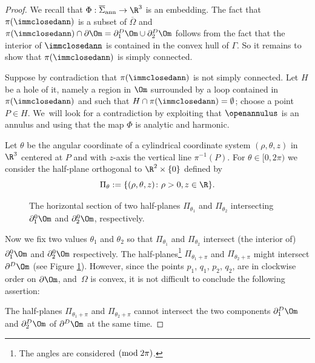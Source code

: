 \begin{proof}
We recall that $\Phi:\overline\Sigma_\mathrm{ann}\to \R^3$ is an embedding. The fact that $\pi(\immclosedann)$ is a subset of $\overline\Omega$ and $\pi(\immclosedann)\cap\partial\Om=\partial_1^D\Om\cup\partial_2^D\Om$ follows from the fact that the interior of $\immclosedann$ is contained in the convex hull of $\Gamma$.
So it remains to show that $\pi(\immclosedann)$ is simply connected.

Suppose by contradiction that $\pi(\immclosedann)$ is not simply connected.
Let $H$ be a hole of it, namely a region in $\Om$ surrounded by a loop contained in $\pi(\immclosedann)$ and such that $H\cap
\pi(\immclosedann)=\emptyset$; choose a point $P\in H$. We~will look for a contradiction by exploiting that $\openannulus$ is an annulus and using that the map $\Phi$ is analytic and harmonic.

Let $\theta$ be the angular coordinate of a cylindrical coordinate system $(\rho,\theta,z)$ in $\R^3$ centered at $P$ and with $z$-axis the vertical line $\pi^{-1}(P)$. For $\theta \in [0,2\pi)$ we consider the
half-plane orthogonal to $\R^2\times\{0\}$ defined by
\[
\Pi_\theta:=\{(\rho,\theta,z)\colon\rho>0,z\in\R\}.
\]
\begin{figure}
\begin{center}
\def\svgwidth{0.40\textwidth}

\caption{The horizontal section of
two half-planes $\Pi_{\theta_1}$ and $\Pi_{\theta_2}$ intersecting $\partial^0_1\Om$ and $\partial^0_2\Om$, respectively.
}\label{fig-costruzione}
\end{center}
\end{figure}
Now we fix two values $\theta_1$ and $\theta_2$ so that $\Pi_{\theta_1}$ and $\Pi_{\theta_2}$ intersect (the interior of) $\partial_1^0\Om$ and $\partial_2^0\Om$ respectively. The half-planes\footnote{The angles are considered $(\textup{mod}\; 2\pi)$.} $\Pi_{\theta_1+\pi}$ and $\Pi_{\theta_2+\pi}$ might intersect $\partial^D\Om$ (see Figure \ref{fig-costruzione}). However, since the points $p_1$, $q_1$, $p_2$, $q_2$, are in clockwise order on $\partial \Om$, and~$\Omega$ is convex, it is not difficult to conclude the following assertion:

The half-planes $\Pi_{\theta_1+\pi}$ and $\Pi_{\theta_2+\pi}$ cannot intersect the two components $\partial_1^D\Om$ and $\partial_2^D\Om$ of $\partial^D\Om$ at the same time.


\end{proof}

